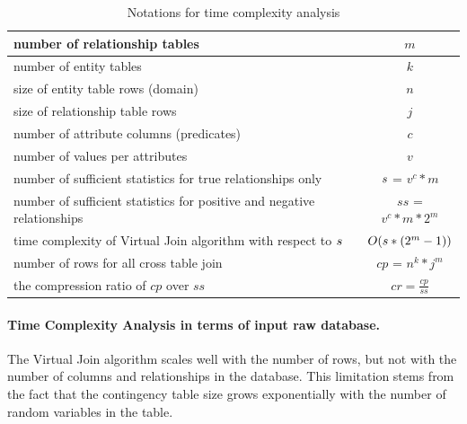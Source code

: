 \documentclass{sfuthesis}
\begin{document}
\begin{table}[htbp]
  \centering
  \caption{Notations for time complexity analysis}
    \begin{tabular}{|l|c|}\hline
    number of relationship tables & $m$ \\ \hline
    number of entity tables & $k$ \\ \hline
    size of entity table rows (domain) & $n$ \\ \hline
    size of relationship table rows & $j$ \\ \hline
    number of attribute columns (predicates) & $c$ \\ \hline
    number of values per attributes & $v$ \\ \hline
    number of sufficient statistics for true relationships only & $s$ = $v^{c}*m$    \\ \hline
    number of sufficient statistics for positive and negative relationships& $ss$ = $v^{c}*m*2^{m} $\\ \hline
    time complexity of Virtual Join algorithm  with respect to $s$  & $O(s * (2^{m}-1))$\\ \hline
    number of rows for all cross table join & $cp$ = $n^{k}*j^{m}$ \\ \hline
    the compression ratio of $cp$ over $ss$  & $cr = \frac{cp}{ ss}$ \\ \hline
    \end{tabular}%
  \label{tab:input-complexity}%
\end{table}%


\paragraph{Time Complexity Analysis in terms of input raw database.}
The Virtual Join algorithm scales well with the number of rows, but not with the number of columns and relationships in the database. This limitation stems from the fact that the contingency table size grows exponentially with the number of random variables in the table. 
\end{document}
